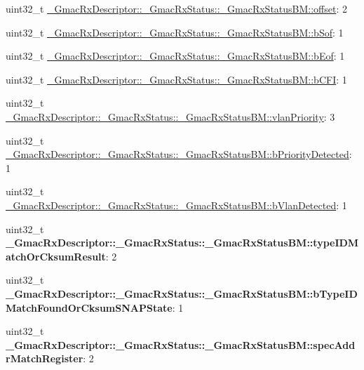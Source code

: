 \begin{DoxyCompactItemize}
uint32\+\_\+t \mbox{\hyperlink{group__gmac__defines_gab38a4fb2bdc30d8e44568cbe573cc6ca}{\+\_\+\+Gmac\+Rx\+Descriptor\+::\+\_\+\+Gmac\+Rx\+Status\+::\+\_\+\+Gmac\+Rx\+Status\+B\+M\+::offset}}\+: 2
\item 
uint32\+\_\+t \mbox{\hyperlink{group__gmac__defines_ga7026ef3a4c69489e2698efc5887cfcd1}{\+\_\+\+Gmac\+Rx\+Descriptor\+::\+\_\+\+Gmac\+Rx\+Status\+::\+\_\+\+Gmac\+Rx\+Status\+B\+M\+::b\+Sof}}\+: 1
\item 
uint32\+\_\+t \mbox{\hyperlink{group__gmac__defines_ga650b2f5822144700bc1e625d9349e768}{\+\_\+\+Gmac\+Rx\+Descriptor\+::\+\_\+\+Gmac\+Rx\+Status\+::\+\_\+\+Gmac\+Rx\+Status\+B\+M\+::b\+Eof}}\+: 1
\item 
uint32\+\_\+t \mbox{\hyperlink{group__gmac__defines_ga614ebbda15781fa167acefa95bf80968}{\+\_\+\+Gmac\+Rx\+Descriptor\+::\+\_\+\+Gmac\+Rx\+Status\+::\+\_\+\+Gmac\+Rx\+Status\+B\+M\+::b\+C\+FI}}\+: 1
\item 
uint32\+\_\+t \mbox{\hyperlink{group__gmac__defines_ga95d12d896b178ea460ee0350114d04f4}{\+\_\+\+Gmac\+Rx\+Descriptor\+::\+\_\+\+Gmac\+Rx\+Status\+::\+\_\+\+Gmac\+Rx\+Status\+B\+M\+::vlan\+Priority}}\+: 3
\item 
uint32\+\_\+t \mbox{\hyperlink{group__gmac__defines_ga0ab37f6aeafe77aaef506cc23e023a3d}{\+\_\+\+Gmac\+Rx\+Descriptor\+::\+\_\+\+Gmac\+Rx\+Status\+::\+\_\+\+Gmac\+Rx\+Status\+B\+M\+::b\+Priority\+Detected}}\+: 1
\item 
uint32\+\_\+t \mbox{\hyperlink{group__gmac__defines_ga8caa121d2ce4282773dfb84e332afbf1}{\+\_\+\+Gmac\+Rx\+Descriptor\+::\+\_\+\+Gmac\+Rx\+Status\+::\+\_\+\+Gmac\+Rx\+Status\+B\+M\+::b\+Vlan\+Detected}}\+: 1
\item 
\mbox{\label{group__gmac__defines_gae5fddad9fb93e80bbc67f424b950c1a2}} 
uint32\+\_\+t {\bfseries \+\_\+\+Gmac\+Rx\+Descriptor\+::\+\_\+\+Gmac\+Rx\+Status\+::\+\_\+\+Gmac\+Rx\+Status\+B\+M\+::type\+I\+D\+Match\+Or\+Cksum\+Result}\+: 2
\item 
\mbox{\label{group__gmac__defines_ga2f125c5523a0b6485a189755ae54bf11}} 
uint32\+\_\+t {\bfseries \+\_\+\+Gmac\+Rx\+Descriptor\+::\+\_\+\+Gmac\+Rx\+Status\+::\+\_\+\+Gmac\+Rx\+Status\+B\+M\+::b\+Type\+I\+D\+Match\+Found\+Or\+Cksum\+S\+N\+A\+P\+State}\+: 1
\item 
\mbox{\label{group__gmac__defines_ga2a00fd4699bce5a78ed5ddfa59f833a6}} 
uint32\+\_\+t {\bfseries \+\_\+\+Gmac\+Rx\+Descriptor\+::\+\_\+\+Gmac\+Rx\+Status\+::\+\_\+\+Gmac\+Rx\+Status\+B\+M\+::spec\+Addr\+Match\+Register}\+: 2

\end{DoxyCompactItemize}
